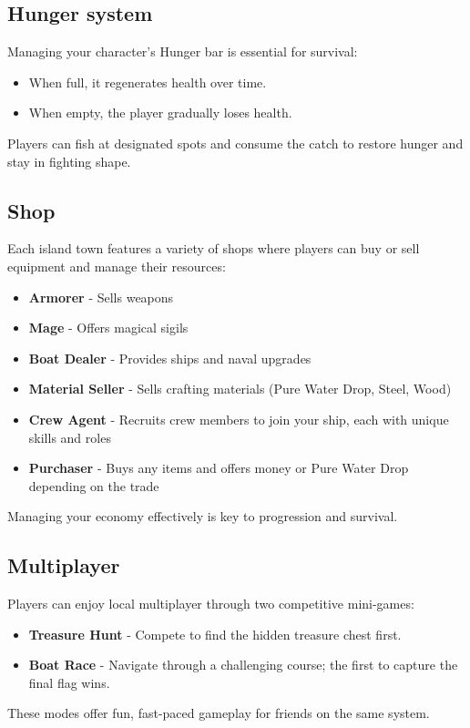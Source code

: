\documentclass{article}
\begin{document}
\subsection{Hunger system}
Managing your character’s Hunger bar is essential for survival:
\begin{itemize}
    \item When full, it regenerates health over time.
    \item When empty, the player gradually loses health.
\end{itemize}
Players can fish at designated spots and consume the catch to restore hunger and stay in fighting shape.

\subsection{Shop}
Each island town features a variety of shops where players can buy or sell equipment and manage their resources:
\begin{itemize}
    \item \textbf{Armorer} - Sells weapons
    \item \textbf{Mage} - Offers magical sigils
    \item \textbf{Boat Dealer} - Provides ships and naval upgrades
    \item \textbf{Material Seller} - Sells crafting materials (Pure Water Drop, Steel, Wood)
    \item \textbf{Crew Agent} - Recruits crew members to join your ship, each with unique skills and roles
    \item \textbf{Purchaser} - Buys any items and offers money or Pure Water Drop depending on the trade
\end{itemize}
Managing your economy effectively is key to progression and survival.

\subsection{Multiplayer}
Players can enjoy local multiplayer through two competitive mini-games:
\begin{itemize}
    \item \textbf{Treasure Hunt} - Compete to find the hidden treasure chest first.
    \item \textbf{Boat Race} - Navigate through a challenging course; the first to capture the final flag wins.
\end{itemize}
These modes offer fun, fast-paced gameplay for friends on the same system.
\end{document}
